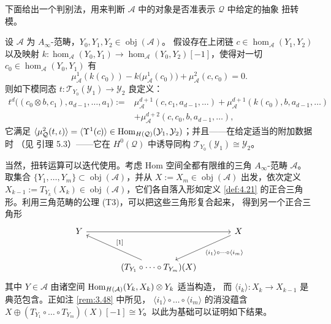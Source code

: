 下面给出一个判别法，用来判断 $\mathcal A$ 中的对象是否准表示 $\mathcal Q$ 中给定的抽象
扭转模。

\begin{Lem}\label{lem:4.23}
设 $\mathcal A$ 为 $A_\infty$-范畴，$Y_0,Y_1,Y_2\in\operatorname{obj}(\mathcal A)$。
假设存在上闭链 $c\in\hom_{\mathcal A}(Y_1,Y_2)$ 以及映射
$k:\hom_{\mathcal A}(Y_0,Y_1)\to\hom_{\mathcal A}(Y_0,Y_2)[-1]$，使得对一切
$c_0\in\hom_{\mathcal A}(Y_0,Y_1)$ 有
\[
  \mu^1_{\mathcal A}(k(c_0))-k\bigl(\mu^1_{\mathcal A}(c_0)\bigr)
  +\mu^2_{\mathcal A}(c,c_0)=0.
\]
则如下模同态 $t:\mathcal T_{Y_0}(\mathcal Y_1)\to\mathcal Y_2$ 良定义：
\[
  \begin{aligned}
    t^d\bigl((c_0\otimes b,c_1),a_{d-1},\dots,a_1\bigr)
    :={}&\mu^{d+1}_{\mathcal A}(c,c_1,a_{d-1},\dots)
      +\mu^{d+1}_{\mathcal A}(k(c_0),b,a_{d-1},\dots)\\
      &+\mu^{d+2}_{\mathcal A}(c,c_0,b,a_{d-1},\dots),
  \end{aligned}
\]
它满足 $\langle\mu^2_{\mathcal Q}(t,\iota)\rangle=\langle\Upsilon^1(c)\rangle
\in\operatorname{Hom}_{H(\mathcal Q)}(\mathcal Y_1,\mathcal Y_2)$；并且——在给定适当的附加数据时
（见 \cite{Sei08} 引理 5.3）——它在 $H^0(\mathcal Q)$ 中诱导同构
$\mathcal T_{Y_0}(\mathcal Y_1)\cong\mathcal Y_2$。
\end{Lem}

当然，扭转运算可以迭代使用。考虑 Hom 空间全都有限维的三角 $A_\infty$-范畴
$\mathcal A$。取集合 $\{Y_1,\dots,Y_m\}\subset\operatorname{obj}(\mathcal A)$，并从
$X:=X_m\in\operatorname{obj}(\mathcal A)$ 出发，依次定义
$X_{k-1}:=T_{Y_k}(X_k)\in\operatorname{obj}(\mathcal A)$，它们各自落入形如定义
\ref{def:4.21} 的正合三角形。利用三角范畴的公理 (T3)，可以把这些三角形复合起来，
得到另一个正合三角形
\[
  \begin{tikzcd}[row sep=large, column sep=large]
    Y \arrow[rr] & & X \arrow[dl, "{\langle i_1\rangle\circ\dots\circ\langle i_m\rangle}"] \\
    & (T_{Y_1}\circ\dots\circ T_{Y_m})(X) \arrow[ul, "{[}1{]}"'] &
  \end{tikzcd}
\]
其中 $Y\in\mathcal A$ 由诸空间 $\operatorname{Hom}_{H(\mathcal A)}(Y_k,X_k)\otimes Y_k$ 适当构造，
而 $\langle i_k\rangle:X_k\to X_{k-1}$ 是典范包含。正如注 \ref{rem:3.48} 中所见，
$\langle i_1\rangle\circ\dots\circ\langle i_m\rangle$ 的消没蕴含
$X\oplus(T_{Y_1}\circ\dots\circ T_{Y_m})(X)[-1]\cong Y$。以此为基础可以证明如下结果。

